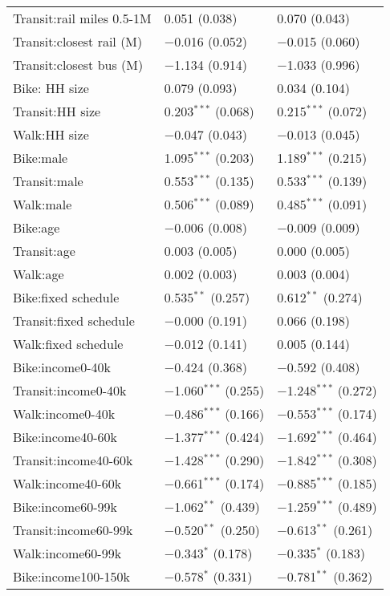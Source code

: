 \begin{longtabu}{lll}
	Transit:rail miles 0.5-1M & 0.051 (0.038) & 0.070 (0.043) \\ 
	Transit:closest rail (M) & $-$0.016 (0.052) & $-$0.015 (0.060) \\ 
	Transit:closest bus (M) & $-$1.134 (0.914) & $-$1.033 (0.996) \\ 
	Bike: HH size & 0.079 (0.093) & 0.034 (0.104) \\ 
	Transit:HH size & 0.203$^{***}$ (0.068) & 0.215$^{***}$ (0.072) \\ 
	Walk:HH size & $-$0.047 (0.043) & $-$0.013 (0.045) \\ 
	Bike:male & 1.095$^{***}$ (0.203) & 1.189$^{***}$ (0.215) \\ 
	Transit:male & 0.553$^{***}$ (0.135) & 0.533$^{***}$ (0.139) \\ 
	Walk:male & 0.506$^{***}$ (0.089) & 0.485$^{***}$ (0.091) \\ 
	Bike:age & $-$0.006 (0.008) & $-$0.009 (0.009) \\ 
	Transit:age & 0.003 (0.005) & 0.000 (0.005) \\ 
	Walk:age & 0.002 (0.003) & 0.003 (0.004) \\ 
	Bike:fixed schedule & 0.535$^{**}$ (0.257) & 0.612$^{**}$ (0.274) \\ 
	Transit:fixed schedule & $-$0.000 (0.191) & 0.066 (0.198) \\ 
	Walk:fixed schedule & $-$0.012 (0.141) & 0.005 (0.144) \\ 
	Bike:income0-40k & $-$0.424 (0.368) & $-$0.592 (0.408) \\ 
	Transit:income0-40k & $-$1.060$^{***}$ (0.255) & $-$1.248$^{***}$ (0.272) \\ 
	Walk:income0-40k & $-$0.486$^{***}$ (0.166) & $-$0.553$^{***}$ (0.174) \\ 
	Bike:income40-60k & $-$1.377$^{***}$ (0.424) & $-$1.692$^{***}$ (0.464) \\ 
	Transit:income40-60k & $-$1.428$^{***}$ (0.290) & $-$1.842$^{***}$ (0.308) \\ 
	Walk:income40-60k & $-$0.661$^{***}$ (0.174) & $-$0.885$^{***}$ (0.185) \\ 
	Bike:income60-99k & $-$1.062$^{**}$ (0.439) & $-$1.259$^{***}$ (0.489) \\ 
	Transit:income60-99k & $-$0.520$^{**}$ (0.250) & $-$0.613$^{**}$ (0.261) \\ 
	Walk:income60-99k & $-$0.343$^{*}$ (0.178) & $-$0.335$^{*}$ (0.183) \\ 
	Bike:income100-150k & $-$0.578$^{*}$ (0.331) & $-$0.781$^{**}$ (0.362) \\ 

\end{longtabu}
